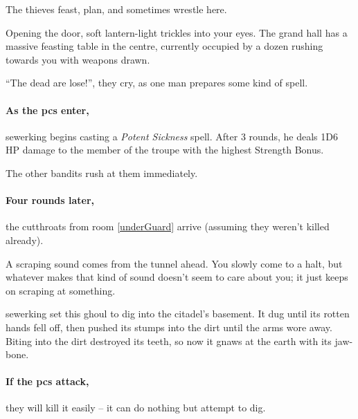 
The thieves feast, plan, and sometimes wrestle here.

\begin{boxtext}
  Opening the door, soft lantern-light trickles into your eyes.
  The grand hall has a massive feasting table in the centre, currently occupied by a dozen rushing towards you with weapons drawn.

  ``The dead are lose!'', they cry, as one man prepares some kind of spell.
\end{boxtext}

\paragraph{As the \glspl{pc} enter,}
\gls{sewerking} begins casting a \textit{Potent Sickness} spell.
After 3 rounds, he deals 1D6 HP damage to the member of the troupe with the highest Strength Bonus.

The other bandits rush at them immediately.

\sewerking


\paragraph{Four rounds later,}
the cutthroats from room \ref{underGuard} arrive (assuming they weren't killed already).


\begin{boxtext}
  A scraping sound comes from the tunnel ahead.
  You slowly come to a halt, but whatever makes that kind of sound doesn't seem to care about you; it just keeps on scraping at something.
\end{boxtext}
 
\begin{exampletext}
  \Gls{sewerking} set this ghoul to dig into the citadel's basement.
  It dug until its rotten hands fell off, then pushed its stumps into the dirt until the arms wore away.
  Biting into the dirt destroyed its teeth, so now it gnaws at the earth with its jaw-bone.
\end{exampletext}

\paragraph{If the \glspl{pc} attack,}
they will kill it easily -- it can do nothing but attempt to dig.

